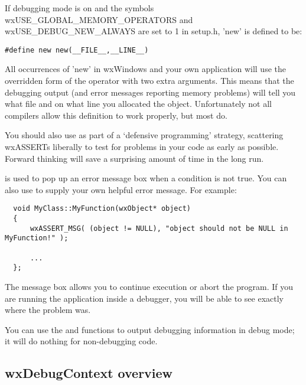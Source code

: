 If debugging mode is on and the symbols wxUSE\_GLOBAL\_MEMORY\_OPERATORS and
wxUSE\_DEBUG\_NEW\_ALWAYS are set to 1 in setup.h, 'new' is defined to be:

{\small
\begin{verbatim}
#define new new(__FILE__,__LINE__)
\end{verbatim}
}%

All occurrences of 'new' in wxWindows and your own application will use
the overridden form of the operator with two extra arguments. This means that the debugging
output (and error messages reporting memory problems) will tell you what
file and on what line you allocated the object. Unfortunately not all
compilers allow this definition to work properly, but most do.


You should also use  as part of a `defensive programming' strategy,
scattering wxASSERTs liberally to test for problems in your code as early as possible. Forward thinking
will save a surprising amount of time in the long run.

 is used to pop up an error message box when a condition
is not true. You can also use  to supply your
own helpful error message. For example:

{\small
\begin{verbatim}
  void MyClass::MyFunction(wxObject* object)
  {
      wxASSERT_MSG( (object != NULL), "object should not be NULL in MyFunction!" );

      ...
  };
\end{verbatim}
}

The message box allows you to continue execution or abort the program. If you are running
the application inside a debugger, you will be able to see exactly where the problem was.


You can use the  and  functions to output debugging information in debug mode;
it will do nothing for non-debugging code.

\subsection{wxDebugContext overview}\label{wxdebugcontextoverview}


